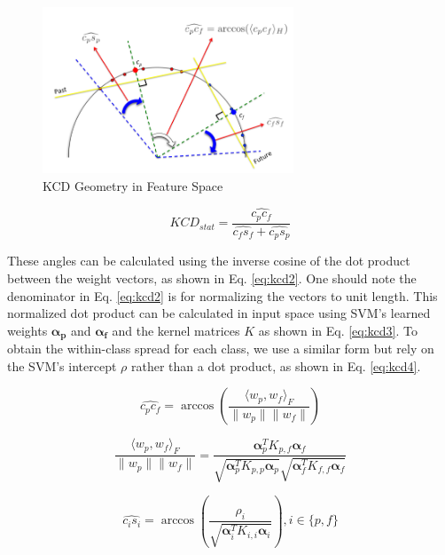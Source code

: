 \documentclass[12pt]{article}
\begin{document}
\begin{figure}[htbp]
\begin{center}
\includegraphics[width=0.667\textwidth]{kcd.png}
\caption{KCD Geometry in Feature Space}
\label{fig:kcdGeo}
\end{center}
\end{figure}

\begin{equation}
\label{eq:kcd}
KCD_{stat} = \frac{\widehat{c_pc_f}}{\widehat{c_fs_f} + \widehat{c_ps_p}}
\end{equation}

These angles can be calculated using the inverse cosine of the dot product between the weight vectors, as shown in Eq. \ref{eq:kcd2}.
One should note the denominator in Eq. \ref{eq:kcd2} is for normalizing the vectors to unit length.
This normalized dot product can be calculated in input space using SVM's learned weights $\boldsymbol{\alpha_p}$ and $\boldsymbol{\alpha_f}$ and the kernel matrices $K$ as shown in Eq. \ref{eq:kcd3}.
To obtain the within-class spread for each class, we use a similar form but rely on the SVM's intercept $\rho$ rather than a dot product, as shown in Eq. \ref{eq:kcd4}.

\begin{equation}
\label{eq:kcd2}
\widehat{c_pc_f} = \arccos \left(\frac{\langle w_p, w_f \rangle_F}{\| w_p \|\| w_f \|} \right)
\end{equation}

\begin{equation}
\label{eq:kcd3}
\frac{\langle w_p, w_f \rangle_F}{\| w_p \|\| w_f \|}  = \frac{\boldsymbol{\alpha}_p^T K_{p, f} \boldsymbol{\alpha}_f }{\sqrt{\boldsymbol{\alpha}_p^T K_{p, p} \boldsymbol{\alpha}_p }\sqrt{\boldsymbol{\alpha}_f^T K_{f, f} \boldsymbol{\alpha}_f }}
\end{equation}

\begin{equation}
\label{eq:kcd4}
\widehat{c_is_i} = \arccos \left(\frac{\rho_i}{\sqrt{\boldsymbol{\alpha}_i^T K_{i,i} \boldsymbol{\alpha}_i }} \right), i \in \{ p, f \}
\end{equation}
\end{document}
